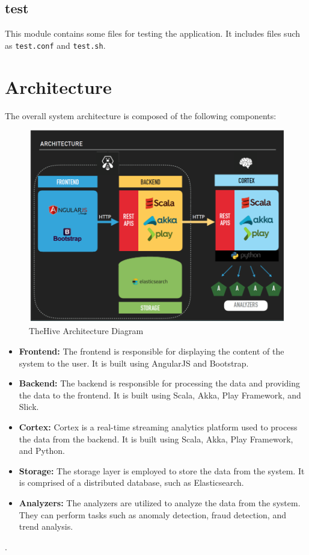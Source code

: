 \documentclass{article}
\begin{document}
\subsection{test}

This module contains some files for testing the application. It includes files such as \texttt{test.conf} and \texttt{test.sh}.

\section{Architecture}
The overall system architecture is composed of the following components:
\begin{figure}[ht]
  \centering
  \includegraphics[width=0.8\linewidth]{img1.png}
  \caption{ TheHive Architecture Diagram}
  \label{fig:architecture}
\end{figure}

\begin{itemize}
  \item \textbf{Frontend:} The frontend is responsible for displaying the content of the system to the user. It is built using AngularJS and Bootstrap.

  \item \textbf{Backend:} The backend is responsible for processing the data and providing the data to the frontend. It is built using Scala, Akka, Play Framework, and Slick.

  \item \textbf{Cortex:} Cortex is a real-time streaming analytics platform used to process the data from the backend. It is built using Scala, Akka, Play Framework, and Python.

  \item \textbf{Storage:} The storage layer is employed to store the data from the system. It is comprised of a distributed database, such as Elasticsearch.

  \item \textbf{Analyzers:} The analyzers are utilized to analyze the data from the system. They can perform tasks such as anomaly detection, fraud detection, and trend analysis.
\end{itemize}.
\end{document}
